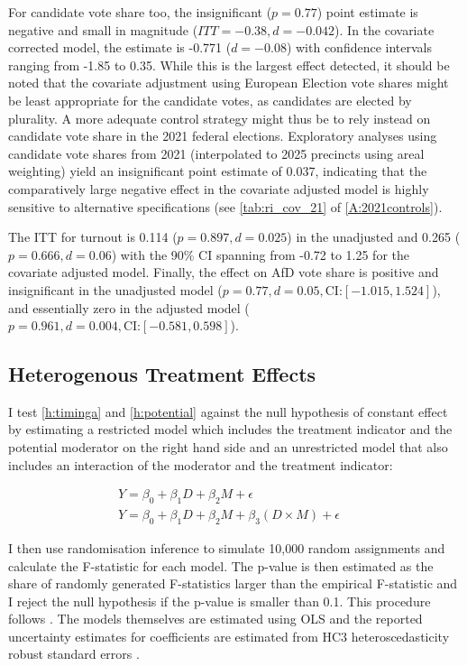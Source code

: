 \documentclass[11pt,a4paper]{scrartcl}
\begin{document}
For candidate vote share too, the insignificant ($p = 0.77$) point estimate is negative and small in magnitude ($ITT = -0.38, d = -0.042$). In the covariate corrected model, the estimate is -0.771 ($d = -0.08$) with confidence intervals ranging from -1.85 to 0.35. While this is the largest effect detected, it should be noted that the covariate adjustment using European Election vote shares might be least appropriate for the candidate votes, as candidates are elected by plurality.  A more adequate control strategy might thus be to rely instead on candidate vote share in the 2021 federal elections. Exploratory analyses using candidate vote shares from 2021 (interpolated to 2025 precincts using areal weighting) yield an insignificant point estimate of 0.037, indicating that the comparatively large negative effect in the covariate adjusted model is highly sensitive to alternative specifications (see \autoref{tab:ri_cov_21} of \autoref{A:2021controls}).



The ITT for turnout is 0.114 ($p = 0.897, d = 0.025$) in the unadjusted and 0.265 ($p = 0.666, d = 0.06$) with the 90\% CI spanning from -0.72 to 1.25 for the covariate adjusted model. Finally, the effect on AfD vote share is positive and insignificant in the unadjusted model ($p = 0.77, d = 0.05, \text{CI:} [-1.015, 1.524]$), and essentially zero in the adjusted model ($p = 0.961, d = 0.004, \text{CI:} [-0.581, 0.598]$).




\subsection{Heterogenous Treatment Effects}
I test \autoref{h:timinga} and \ref{h:potential} against the null hypothesis of constant effect by estimating a restricted model which includes the treatment indicator and the potential moderator on the right hand side and an unrestricted model that also includes an interaction of the moderator and the treatment indicator:

\begin{gather}
	Y = \beta_0 + \beta_{1} D + \beta_2 M + \epsilon \quad \tag{Restricted Model} \\
	Y = \beta_0 + \beta_1 D + \beta_2 M + \beta_3 (D \times M) + \epsilon \quad \tag{Unrestricted Model}
\end{gather}

I then use randomisation inference to simulate 10,000 random assignments and calculate the F-statistic for each model. The p-value is then estimated as the share of randomly generated F-statistics larger than the empirical F-statistic and  I reject the null hypothesis if the p-value is smaller than 0.1. This procedure follows \textcite[298-299]{gerberFieldExperimentsDesign2012}. The models themselves are estimated using OLS and the reported uncertainty estimates for coefficients are estimated from HC3 heteroscedasticity robust standard errors \autocite{longUsingHeteroscedasticityConsistent2000}.
\end{document}

